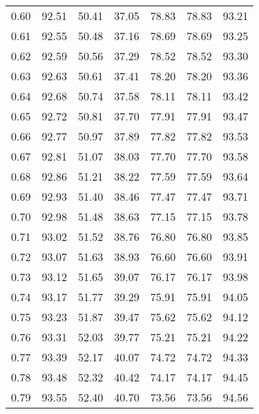 \begin{tabular}{|c|c|c|c|c|c|c|}
      0.60 &     92.51 &     50.41 &      37.05 &   78.83 &      78.83 &         93.21 \\
      0.61 &     92.55 &     50.48 &      37.16 &   78.69 &      78.69 &         93.25 \\
      0.62 &     92.59 &     50.56 &      37.29 &   78.52 &      78.52 &         93.30 \\
      0.63 &     92.63 &     50.61 &      37.41 &   78.20 &      78.20 &         93.36 \\
      0.64 &     92.68 &     50.74 &      37.58 &   78.11 &      78.11 &         93.42 \\
      0.65 &     92.72 &     50.81 &      37.70 &   77.91 &      77.91 &         93.47 \\
      0.66 &     92.77 &     50.97 &      37.89 &   77.82 &      77.82 &         93.53 \\
      0.67 &     92.81 &     51.07 &      38.03 &   77.70 &      77.70 &         93.58 \\
      0.68 &     92.86 &     51.21 &      38.22 &   77.59 &      77.59 &         93.64 \\
      0.69 &     92.93 &     51.40 &      38.46 &   77.47 &      77.47 &         93.71 \\
      0.70 &     92.98 &     51.48 &      38.63 &   77.15 &      77.15 &         93.78 \\
      0.71 &     93.02 &     51.52 &      38.76 &   76.80 &      76.80 &         93.85 \\
      0.72 &     93.07 &     51.63 &      38.93 &   76.60 &      76.60 &         93.91 \\
      0.73 &     93.12 &     51.65 &      39.07 &   76.17 &      76.17 &         93.98 \\
      0.74 &     93.17 &     51.77 &      39.29 &   75.91 &      75.91 &         94.05 \\
      0.75 &     93.23 &     51.87 &      39.47 &   75.62 &      75.62 &         94.12 \\
      0.76 &     93.31 &     52.03 &      39.77 &   75.21 &      75.21 &         94.22 \\
      0.77 &     93.39 &     52.17 &      40.07 &   74.72 &      74.72 &         94.33 \\
      0.78 &     93.48 &     52.32 &      40.42 &   74.17 &      74.17 &         94.45 \\
      0.79 &     93.55 &     52.40 &      40.70 &   73.56 &      73.56 &         94.56 \\

\end{tabular}
